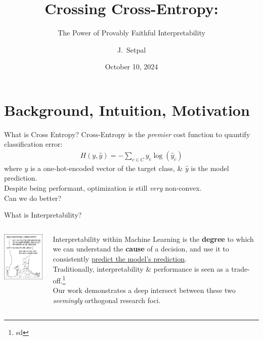 \documentclass{beamer}
\title[Contrastive Optimization]{Crossing Cross-Entropy:}
\subtitle{The Power of Provably Faithful Interpretability}
\author[Mathematical Foundations of DL] %
{J.~Setpal}
\date{October 10, 2024}
\begin{document}
\frame{\titlepage}

\section{Background, Intuition, Motivation}
\begin{frame}{What is Cross Entropy?}
	Cross-Entropy is the \textit{premier} cost function to quantify classification error:
	\begin{gather}
		H(y, \hat{y}) = - \sum_{c \in C} y_c \log(\hat{y}_c)
	\end{gather}
	where $y$ is a one-hot-encoded vector of the target class, \& $\hat{y}$ is the model prediction. \pause \newline \\

	Despite being performant, optimization is still \textit{very} non-convex. \pause \newline \\

	Can we do better?
\end{frame}

\begin{frame}{What is Interpretability?}
		\begin{columns}
		\begin{column}{0.5\textwidth}
			\begin{center}
				\includegraphics[width=5cm]{img/1838} \pause
			\end{center}
		\end{column}
		\begin{column}{0.5\textwidth}
			Interpretability within Machine Learning is the \textbf{degree} to which we can understand the \textbf{cause} of a decision, and use it to consistently \underline{predict the model's prediction}. \pause \newline \\

			Traditionally, interpretability \& performance is seen as a trade-off.\footnote{sd} \pause \newline \\

			Our work demonstrates a deep intersect between these two \textit{seemingly} orthogonal research foci.
		\end{column}
	\end{columns}
\end{frame}
\end{document}

